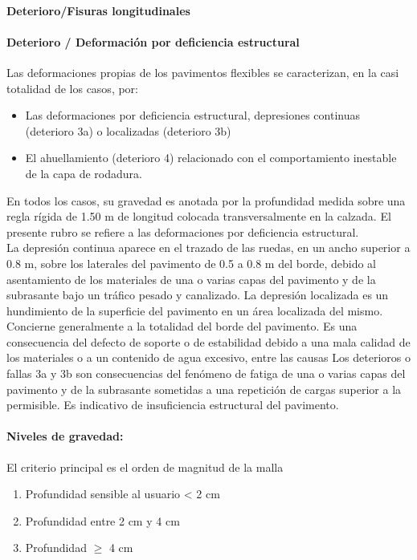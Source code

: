 	\paragraph{Deterioro/Fisuras longitudinales}

\paragraph{Deterioro / Deformación por deficiencia estructural}

	Las deformaciones propias de los pavimentos flexibles se caracterizan, en la casi totalidad de los casos, por:
	\begin{itemize}[label=\HandRight]
		\item Las deformaciones por deficiencia estructural, depresiones continuas (deterioro 3a) o localizadas (deterioro 3b)
		\item El ahuellamiento (deterioro 4) relacionado con el comportamiento inestable de la capa de rodadura.
	\end{itemize}
	En todos los casos, su gravedad es anotada por la profundidad medida sobre una regla rígida de 1.50 m de longitud colocada transversalmente en la calzada. El presente rubro se refiere a las deformaciones por deficiencia estructural.\\
	La depresión continua aparece en el trazado de las ruedas, en un ancho superior a 0.8 m, sobre los laterales del pavimento de 0.5 a 0.8 m del borde, debido al asentamiento de los materiales de una o varias capas del pavimento y de la subrasante bajo un tráfico pesado y canalizado.	La depresión localizada es un hundimiento de la superficie del pavimento en un área localizada del mismo. Concierne generalmente a la totalidad del borde del pavimento. Es una consecuencia del defecto de soporte o de estabilidad debido a una mala calidad de los materiales o a un contenido de agua excesivo, entre las causas Los deterioros o fallas 3a y 3b son consecuencias del fenómeno de fatiga de una o varias capas del pavimento y de la subrasante sometidas a una repetición de cargas superior a la permisible. Es indicativo de insuficiencia estructural del pavimento.
	\paragraph*{Niveles de gravedad:} El criterio principal es el orden de magnitud de la malla 
	\begin{enumerate}
		\renewcommand{\labelenumi}{\alph{enumi})} 
		\item Profundidad sensible al usuario < 2 cm
		\item Profundidad entre 2 cm y 4 cm
		\item Profundidad $\geq$ 4 cm
	\end{enumerate}
	
